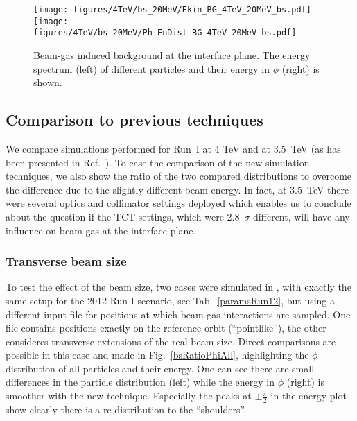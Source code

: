 \begin{figure}%
\centering
\texttt{[image: figures/4TeV/bs\_20MeV/Ekin\_BG\_4TeV\_20MeV\_bs.pdf]}
\texttt{[image: figures/4TeV/bs\_20MeV/PhiEnDist\_BG\_4TeV\_20MeV\_bs.pdf]}
 \caption{Beam-gas induced background at the interface plane. The energy spectrum (left) of different particles and their energy in $\phi$ (right) is shown.
  \label{dist4TeVBGbs}}
\end{figure}
\subsection{Comparison to previous techniques}

We compare simulations performed for Run~I at 4 TeV and at 3.5~TeV (as has been presented in Ref.~\cite{nimPaperRod}). To ease the comparison of the new simulation techniques, we also show the ratio of the two compared distributions to overcome the difference due to the slightly different beam energy. In fact, at 3.5~TeV there were several optics and collimator settings deployed which enables us to conclude about the question if the TCT settings, which were 2.8~$\sigma$ different, will have any influence on beam-gas at the interface plane. 


\subsubsection{Transverse beam size}
To test the effect of the beam size, two cases were simulated in \fluka, with exactly the same setup for the 2012 Run I scenario, see Tab.~\ref{paramsRun12}, but using a different input file for positions at which beam-gas interactions are sampled. One file contains positions exactly on the reference orbit (``pointlike''), the other consideres transverse extensions of the real beam size. Direct comparisons are possible in this case and made in Fig.~\ref{bsRatioPhiAll}, highlighting the $\phi$ distribution of all particles and their energy. One can see there are small differences in the particle distribution (left) while the energy in $\phi$ (right) is smoother with the new technique. Especially the peaks at $\pm \frac{\pi}{2}$ in the energy plot show clearly there is a re-distribution to the ``shoulders''.


